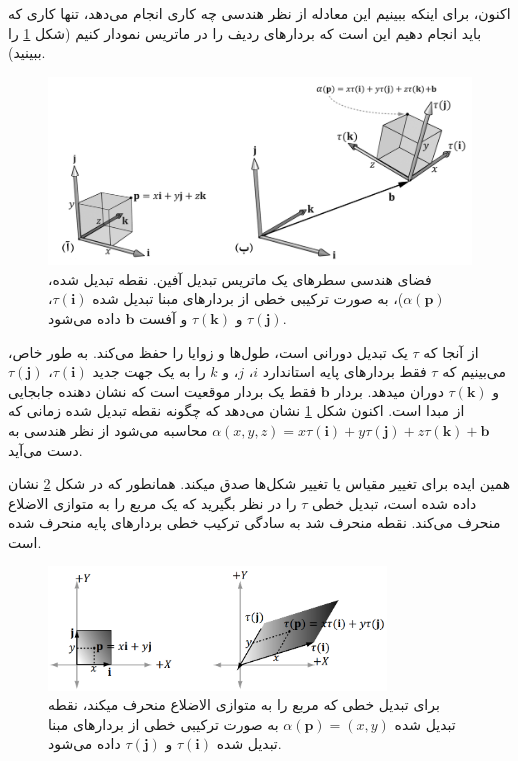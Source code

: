 {\begin{spacing}{1.5}
        اکنون، برای اینکه ببینیم این معادله از نظر هندسی چه کاری انجام می‌دهد، تنها کاری که باید انجام دهیم این است که بردارهای ردیف را در ماتریس نمودار کنیم (شکل \ref{fig:4.Session.1.3.7} را ببینید).
        \begin{figure}[H]
            \centering
            \setlength{\belowcaptionskip}{-10pt}
            \includegraphics[width=\textwidth]{Images/4/3/4.Session.1.3.7}
            \caption {فضای هندسی سطرهای یک ماتریس تبدیل آفین. نقطه تبدیل شده، $\alpha(\textbf{p})$)، به صورت ترکیبی خطی از بردارهای مبنا تبدیل شده $\tau(\textbf{i})$، $\tau(\textbf{j})$ و $\tau(\textbf{k})$ و آفست $\textbf{b}$ داده می‌شود.}
            \label{fig:4.Session.1.3.7}
        \end{figure}
        از آنجا که $\tau$ یک تبدیل دورانی است، طول‌ها و زوایا را حفظ می‌کند.
        به طور خاص، می‌بینیم که $\tau$ فقط بردارهای پایه استاندارد $i$، $j$، و $k$ را به یک جهت جدید $\tau(\textbf{i})$، $\tau(\textbf{j})$ و $\tau(\textbf{k})$ دوران میدهد.
        بردار $\textbf{b}$ فقط یک بردار موقعیت است که نشان دهنده جابجایی از مبدا است.
        اکنون شکل \ref{fig:4.Session.1.3.7} نشان می‌دهد که چگونه نقطه تبدیل شده زمانی که $\alpha(x,y,z)=x\tau(\textbf{i})+y\tau(\textbf{j})+z\tau(\textbf{k})+\textbf{b}$ محاسبه می‌شود از نظر هندسی به دست می‌آید.

        همین ایده برای تغییر مقیاس یا تغییر شکل‌ها صدق میکند. همانطور که در شکل \ref{fig:4.Session.1.3.8} نشان داده شده است،
        تبدیل خطی $\tau$ را در نظر بگیرید که یک مربع را به متوازی الاضلاع منحرف می‌کند.
        نقطه منحرف شد به سادگی ترکیب خطی بردارهای پایه منحرف شده است.
        \begin{figure}[H]
            \centering
            \setlength{\belowcaptionskip}{-10pt}
            \includegraphics[width=0.8\textwidth]{Images/4/3/4.Session.1.3.8}
            \caption {برای تبدیل خطی که مربع را به متوازی الاضلاع منحرف میکند، نقطه تبدیل شده $\alpha(\textbf{p})=(x,y)$ به صورت ترکیبی خطی از بردارهای مبنا تبدیل شده $\tau(\textbf{i})$ و $\tau(\textbf{j})$ داده می‌شود.}
            \label{fig:4.Session.1.3.8}
        \end{figure}
    \end{spacing}
}



